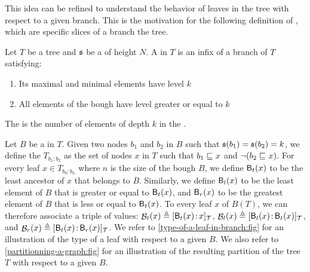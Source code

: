 \AP This idea can be refined to understand the behavior of leaves in the tree
with respect to a given branch. This is the motivation for the following
definition of , which are specific slices of a branch the tree.

\begin{definition}
    \label{ramseyan-branch:def}
    Let $T$ be a tree and $\mathfrak{s}$ be a  of height $N$.
    A  in $T$ is an infix of a branch of $T$
    satisfying:
    \begin{enumerate}
        \item Its maximal and minimal elements have level $k$
        \item All elements of the bough have level greater or equal to $k$
    \end{enumerate}
    The  is the number of elements of depth $k$
    in the .
\end{definition}

\AP Let $B$ be a  in $T$. Given two nodes $b_1$ and
$b_2$ in $B$ such that $\mathfrak{s}(b_1) = \mathfrak{s}(b_2) = k$, we define the $T_{b_1:b_2}$
as the set of nodes $x$ in $T$ such that $b_1 \treeleq x$ and $\neg (b_2
\treeleq x)$. For every leaf $x \in T_{b_0: b_n}$ where $n$ is the size of the
bough $B$, we define $\mathop{\mathsf{B}_t}(x)$ to be the least ancestor of $x$ that belongs to
$B$. Similarly, we define $\mathop{\mathsf{B}_l}(x)$ to be the least element of $B$ that is
greater or equal to $\mathop{\mathsf{B}_t}(x)$, and $\mathop{\mathsf{B}_r}(x)$ to be the greatest element of $B$
that is less or equal to $\mathop{\mathsf{B}_t}(x)$. To every leaf $x$ of $B(T)$, we can
therefore associate a triple of values: $\BtL(x) \defined
\tlbl{\t}{\Bt(x)}{x}$, $\BlL(x) \defined \tlbl{\t}{\Bl(x)}{\Bt(x)}$, and
$\BrL(x) \defined \tlbl{\t}{\Bt(x)}{\Br(x)}$. We refer to
\cref{type-of-a-leaf-in-branch:fig} for an
illustration of the type of a leaf with respect to a given  $B$.
We also refer to \cref{partitionning-a-graph:fig} for an illustration of the
resulting partition of the tree $T$ with respect to a given  $B$.

